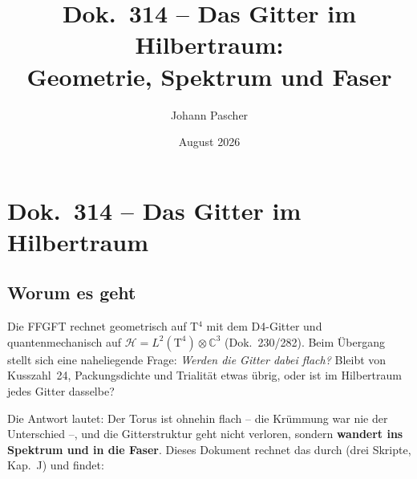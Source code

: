 \documentclass[11pt]{report}
\title{Dok.~314 -- Das Gitter im Hilbertraum:\\
Geometrie, Spektrum und Faser}
\author{Johann Pascher}
\date{August 2026}
\begin{document}
\maketitle
\tableofcontents

\chapter*{Dok.~314 -- Das Gitter im Hilbertraum}

\section*{Worum es geht}

Die FFGFT rechnet geometrisch auf T$^4$ mit dem D4-Gitter und
quantenmechanisch auf $\mathcal{H} = L^2(\text{T}^4)\otimes
\mathbb{C}^3$ (Dok.~230/282). Beim Übergang stellt sich eine
naheliegende Frage: \emph{Werden die Gitter dabei flach?} Bleibt von
Kusszahl~24, Packungsdichte und Trialität etwas übrig, oder ist im
Hilbertraum jedes Gitter dasselbe?

Die Antwort lautet: Der Torus ist ohnehin flach -- die Krümmung war
nie der Unterschied --, und die Gitterstruktur geht nicht verloren,
sondern \textbf{wandert ins Spektrum und in die Faser}. Dieses
Dokument rechnet das durch (drei Skripte, Kap.~J) und findet:
\end{document}
